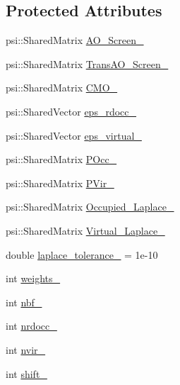 \subsection*{Protected Attributes}
\begin{DoxyCompactItemize}
\item 
psi\+::\+Shared\+Matrix \mbox{\hyperlink{classforte_1_1_atomic_orbital_helper_a5896c9e72821a9b25fdf50a7fe3f41d5}{A\+O\+\_\+\+Screen\+\_\+}}
\item 
psi\+::\+Shared\+Matrix \mbox{\hyperlink{classforte_1_1_atomic_orbital_helper_a717f94e6594b0d6e440eb0cb534fe533}{Trans\+A\+O\+\_\+\+Screen\+\_\+}}
\item 
psi\+::\+Shared\+Matrix \mbox{\hyperlink{classforte_1_1_atomic_orbital_helper_af5afb917090ce71dbf360af4e7542762}{C\+M\+O\+\_\+}}
\item 
psi\+::\+Shared\+Vector \mbox{\hyperlink{classforte_1_1_atomic_orbital_helper_a4cc753aab5b772c6f5bc9af9663c6248}{eps\+\_\+rdocc\+\_\+}}
\item 
psi\+::\+Shared\+Vector \mbox{\hyperlink{classforte_1_1_atomic_orbital_helper_a9497fd7b7a65b41d453ff70909455f40}{eps\+\_\+virtual\+\_\+}}
\item 
psi\+::\+Shared\+Matrix \mbox{\hyperlink{classforte_1_1_atomic_orbital_helper_a111df8cb0812bec57b7c4f7062578b78}{P\+Occ\+\_\+}}
\item 
psi\+::\+Shared\+Matrix \mbox{\hyperlink{classforte_1_1_atomic_orbital_helper_a592c52435831ae234781ecbfb34ad6ad}{P\+Vir\+\_\+}}
\item 
psi\+::\+Shared\+Matrix \mbox{\hyperlink{classforte_1_1_atomic_orbital_helper_ad13f3a30eba62a3c0e62f3e37e391a6f}{Occupied\+\_\+\+Laplace\+\_\+}}
\item 
psi\+::\+Shared\+Matrix \mbox{\hyperlink{classforte_1_1_atomic_orbital_helper_abdd4033673986a208a48a5f3084f4c06}{Virtual\+\_\+\+Laplace\+\_\+}}
\item 
double \mbox{\hyperlink{classforte_1_1_atomic_orbital_helper_ad30e1c8811b274f655fb4a5a7ca0162e}{laplace\+\_\+tolerance\+\_\+}} = 1e-\/10
\item 
int \mbox{\hyperlink{classforte_1_1_atomic_orbital_helper_a2cda118e3b004f18d785b1c14a50ee3e}{weights\+\_\+}}
\item 
int \mbox{\hyperlink{classforte_1_1_atomic_orbital_helper_a69c052b5064e8ed87fd2697a344001e1}{nbf\+\_\+}}
\item 
int \mbox{\hyperlink{classforte_1_1_atomic_orbital_helper_a039b8f61b9eb2acf1562311827247093}{nrdocc\+\_\+}}
\item 
int \mbox{\hyperlink{classforte_1_1_atomic_orbital_helper_ac0f50e9d760abee8b4a90c64acf3f71d}{nvir\+\_\+}}
\item 
int \mbox{\hyperlink{classforte_1_1_atomic_orbital_helper_a6fdce16217872f48ac97362f2524892b}{shift\+\_\+}}
\end{DoxyCompactItemize}



